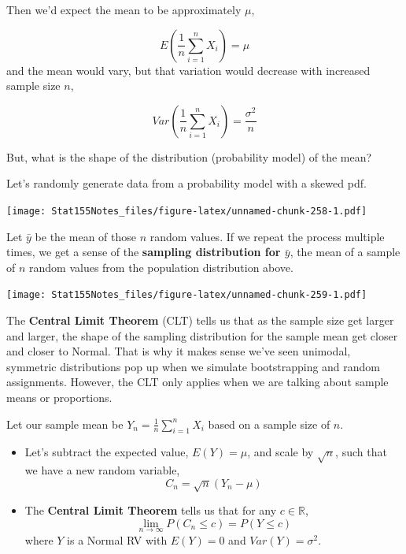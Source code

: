 \documentclass[]{book}
\begin{document}
Then we'd expect the mean to be approximately \(\mu\),

\[E(\frac{1}{n}\sum_{i=1}^n X_i) = \mu\]
and the mean would vary, but that variation would decrease with increased sample size \(n\),

\[Var(\frac{1}{n}\sum_{i=1}^n X_i) = \frac{\sigma^2}{n}\]

But, what is the shape of the distribution (probability model) of the mean?

Let's randomly generate data from a probability model with a skewed pdf.

\texttt{[image: Stat155Notes\_files/figure-latex/unnamed-chunk-258-1.pdf]}

Let \(\bar{y}\) be the mean of those \(n\) random values. If we repeat the process multiple times, we get a sense of the \textbf{sampling distribution for \(\bar{y}\)}, the mean of a sample of \(n\) random values from the population distribution above.

\texttt{[image: Stat155Notes\_files/figure-latex/unnamed-chunk-259-1.pdf]}

The \textbf{Central Limit Theorem} (CLT) tells us that as the sample size get larger and larger, the shape of the sampling distribution for the sample mean get closer and closer to Normal. That is why it makes sense we've seen unimodal, symmetric distributions pop up when we simulate bootstrapping and random assignments. However, the CLT only applies when we are talking about sample means or proportions.

Let our sample mean be \(Y_n = \frac{1}{n}\sum_{i=1}^n X_i\) based on a sample size of \(n\).

\begin{itemize}
\item
  Let's subtract the expected value, \(E(Y) = \mu\), and scale by \(\sqrt{n}\), such that we have a new random variable,
  \[C_n = \sqrt{n}\left(Y_n - \mu\right) \]
\item
  The \textbf{Central Limit Theorem} tells us that for any \(c \in \mathbb{R}\),
  \[\lim_{n\rightarrow\infty}P(C_n \leq c) = P(Y \leq c)\]
  where \(Y\) is a Normal RV with \(E(Y) = 0\) and \(Var(Y) = \sigma^2\).
\end{itemize}
\end{document}
